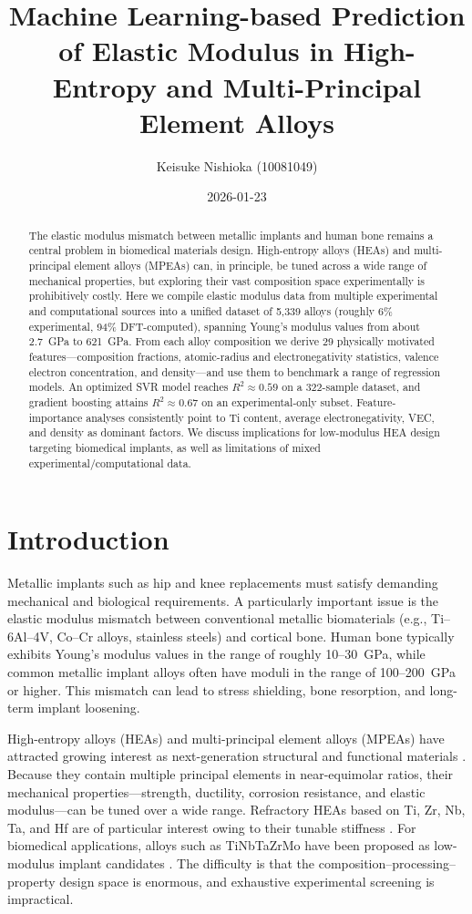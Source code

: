 \documentclass[11pt,a4paper]{article}
\title{Machine Learning-based Prediction of Elastic Modulus in High-Entropy and Multi-Principal Element Alloys}
\author{Keisuke Nishioka (10081049)}
\date{2026-01-23}
\begin{document}
\maketitle

\begin{abstract}
The elastic modulus mismatch between metallic implants and human bone remains a central problem in biomedical materials design. High-entropy alloys (HEAs) and multi-principal element alloys (MPEAs) can, in principle, be tuned across a wide range of mechanical properties, but exploring their vast composition space experimentally is prohibitively costly. Here we compile elastic modulus data from multiple experimental and computational sources into a unified dataset of 5{,}339 alloys (roughly 6\% experimental, 94\% DFT-computed), spanning Young's modulus values from about 2.7~GPa to 621~GPa. From each alloy composition we derive 29 physically motivated features---composition fractions, atomic-radius and electronegativity statistics, valence electron concentration, and density---and use them to benchmark a range of regression models. An optimized SVR model reaches $R^2 \approx 0.59$ on a 322-sample dataset, and gradient boosting attains $R^2 \approx 0.67$ on an experimental-only subset. Feature-importance analyses consistently point to Ti content, average electronegativity, VEC, and density as dominant factors. We discuss implications for low-modulus HEA design targeting biomedical implants, as well as limitations of mixed experimental/computational data.
\end{abstract}

\section{Introduction}

Metallic implants such as hip and knee replacements must satisfy demanding mechanical and biological requirements. A particularly important issue is the elastic modulus mismatch between conventional metallic biomaterials (e.g., Ti--6Al--4V, Co--Cr alloys, stainless steels) and cortical bone. Human bone typically exhibits Young's modulus values in the range of roughly 10--30~GPa, while common metallic implant alloys often have moduli in the range of 100--200~GPa or higher. This mismatch can lead to stress shielding, bone resorption, and long-term implant loosening.

High-entropy alloys (HEAs) and multi-principal element alloys (MPEAs) have attracted growing interest as next-generation structural and functional materials \cite{Miracle2017}. Because they contain multiple principal elements in near-equimolar ratios, their mechanical properties---strength, ductility, corrosion resistance, and elastic modulus---can be tuned over a wide range. Refractory HEAs based on Ti, Zr, Nb, Ta, and Hf are of particular interest owing to their tunable stiffness \cite{Senkov2018}. For biomedical applications, alloys such as TiNbTaZrMo have been proposed as low-modulus implant candidates \cite{Todai2017}. The difficulty is that the composition--processing--property design space is enormous, and exhaustive experimental screening is impractical.
\end{document}
